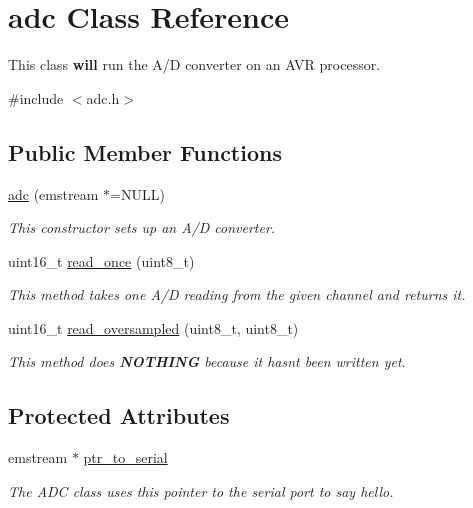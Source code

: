 \hypertarget{classadc}{}\section{adc Class Reference}
\label{classadc}


This class {\bfseries will} run the A/D converter on an A\+VR processor.  




{\ttfamily \#include $<$adc.\+h$>$}

\subsection*{Public Member Functions}
\begin{DoxyCompactItemize}
\item 
\mbox{\hyperlink{classadc_af3b8262c08f5fc5ae325a20622883424}{adc}} (emstream $\ast$=N\+U\+LL)
\begin{DoxyCompactList}\small\item\em This constructor sets up an A/D converter. \end{DoxyCompactList}\item 
uint16\+\_\+t \mbox{\hyperlink{classadc_a2190a59696a7093e1ea605e998ccf97e}{read\+\_\+once}} (uint8\+\_\+t)
\begin{DoxyCompactList}\small\item\em This method takes one A/D reading from the given channel and returns it. \end{DoxyCompactList}\item 
uint16\+\_\+t \mbox{\hyperlink{classadc_a58f1030fe64d3dea4ccd8a2687dd6fce}{read\+\_\+oversampled}} (uint8\+\_\+t, uint8\+\_\+t)
\begin{DoxyCompactList}\small\item\em This method does {\bfseries N\+O\+T\+H\+I\+NG} because it hasn\textquotesingle{}t been written yet. \end{DoxyCompactList}\end{DoxyCompactItemize}
\subsection*{Protected Attributes}
\begin{DoxyCompactItemize}
\item 
\mbox{\label{classadc_a14680b48b723bf1adddd2741ebb18a3e}} 
emstream $\ast$ \mbox{\hyperlink{classadc_a14680b48b723bf1adddd2741ebb18a3e}{ptr\+\_\+to\+\_\+serial}}
\begin{DoxyCompactList}\small\item\em The A\+DC class uses this pointer to the serial port to say hello. \end{DoxyCompactList}\end{DoxyCompactItemize}


